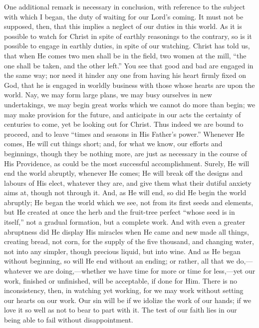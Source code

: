 One additional remark is necessary in conclusion, with reference to
the subject with which I began, the duty of waiting for our Lord's
coming. It must not be supposed, then, that this implies a neglect of
our duties in this world. As it is possible to watch for Christ in
spite of earthly reasonings to the contrary, so is it possible to
engage in earthly duties, in spite of our watching. Christ has told
us, that when He comes two men shall be in the field, two women at the
mill, ``the one shall be taken, and the other left.'' You see
that good and bad are engaged in the same way; nor need it hinder any
one from having his heart firmly fixed on God, that he is engaged in
worldly business with those whose hearts are upon the world. Nay, we
may form large plans, we may busy ourselves in new undertakings, we
may begin great works which we cannot do more than begin; we may make
provision for the future, and anticipate in our acts the certainty of
centuries to come, yet be looking out for Christ. Thus indeed we are
bound to proceed, and to leave ``times and seasons in His Father's
power.'' Whenever He comes, He will cut things short; and, for
what we know, our efforts and beginnings, though they be nothing more,
are just as necessary in the course of His Providence, as could be the
most successful accomplishment. Surely, He will end the world
abruptly, whenever He comes; He will break off the designs and labours
of His elect, whatever they are, and give them what their dutiful
anxiety aims at, though not through it. And, as He will end, so did He
begin the world abruptly; He began the world which we see, not from
its first seeds and elements, but He created at once the herb and the
fruit-tree perfect ``whose seed is in itself,'' not a gradual
formation, but a complete work. And with even a greater abruptness did
He display His miracles when He came and new made all things, creating
bread, not corn, for the supply of the five thousand, and changing
water, not into any simpler, though precious liquid, but into wine.
And as He began without beginning, so will He end without an ending;
or rather, all that we do,—whatever we are doing,—whether we have
time for more or time for less,—yet our work, finished or
unfinished, will be acceptable, if done for Him. There is no
inconsistency, then, in watching yet working, for we may work without
setting our hearts on our work. Our sin will be if we idolize the work
of our hands; if we love it so well as not to bear to part with it.
The test of our faith lies in our being able to fail without
disappointment.

